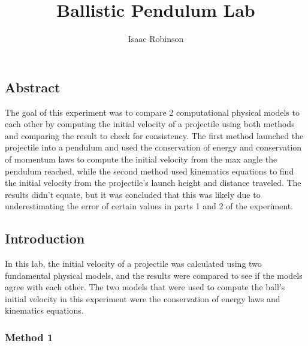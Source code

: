 \documentclass[11pt]{article}
\title{Ballistic Pendulum Lab}
\author{Isaac Robinson}
\begin{document}
    
    \maketitle
    
    

    
    \hypertarget{abstract}{%
\subsection*{\centering Abstract}\label{abstract}}

The goal of this experiment was to compare 2 computational physical
models to each other by computing the initial velocity of a projectile
using both methods and comparing the result to check for consistency.
The first method launched the projectile into a pendulum and used the
conservation of energy and conservation of momentum laws to compute the
initial velocity from the max angle the pendulum reached, while the
second method used kinematics equations to find the initial velocity
from the projectile's launch height and distance traveled. The results
didn't equate, but it was concluded that this was likely due to
underestimating the error of certain values in parts 1 and 2 of the
experiment.

\hypertarget{introduction}{%
\subsection*{\centering Introduction}\label{introduction}}

In this lab, the initial velocity of a projectile was calculated using
two fundamental physical models, and the results were compared to see if
the models agree with each other. The two models that were used to
compute the ball's initial velocity in this experiment were the
conservation of energy laws and kinematics equations.

\hypertarget{method-1}{%
\subsubsection*{\centering Method 1}\label{method-1}}
\end{document}
